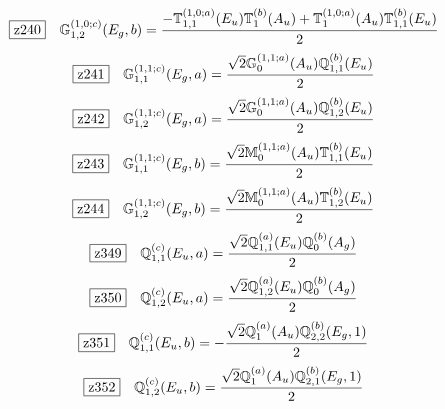 \documentclass[fleqn,10pt,landscape]{jsarticle}
\begin{document}
\begin{dmath*}
\hspace*{3mm}\fbox{z240}\quad \mathbb{G}_{1,2}^{(1,0;c)}(E_{g},b)=\frac{- \mathbb{T}_{1,1}^{(1,0;a)}(E_{u}) \mathbb{T}_{1}^{(b)}(A_{u}) + \mathbb{T}_{1}^{(1,0;a)}(A_{u}) \mathbb{T}_{1,1}^{(b)}(E_{u})}{2}
\end{dmath*}
\begin{dmath*}
\hspace*{3mm}\fbox{z241}\quad \mathbb{G}_{1,1}^{(1,1;c)}(E_{g},a)=\frac{\sqrt{2} \mathbb{G}_{0}^{(1,1;a)}(A_{u}) \mathbb{Q}_{1,1}^{(b)}(E_{u})}{2}
\end{dmath*}
\begin{dmath*}
\hspace*{3mm}\fbox{z242}\quad \mathbb{G}_{1,2}^{(1,1;c)}(E_{g},a)=\frac{\sqrt{2} \mathbb{G}_{0}^{(1,1;a)}(A_{u}) \mathbb{Q}_{1,2}^{(b)}(E_{u})}{2}
\end{dmath*}
\begin{dmath*}
\hspace*{3mm}\fbox{z243}\quad \mathbb{G}_{1,1}^{(1,1;c)}(E_{g},b)=\frac{\sqrt{2} \mathbb{M}_{0}^{(1,1;a)}(A_{u}) \mathbb{T}_{1,1}^{(b)}(E_{u})}{2}
\end{dmath*}
\begin{dmath*}
\hspace*{3mm}\fbox{z244}\quad \mathbb{G}_{1,2}^{(1,1;c)}(E_{g},b)=\frac{\sqrt{2} \mathbb{M}_{0}^{(1,1;a)}(A_{u}) \mathbb{T}_{1,2}^{(b)}(E_{u})}{2}
\end{dmath*}
\begin{dmath*}
\hspace*{3mm}\fbox{z349}\quad \mathbb{Q}_{1,1}^{(c)}(E_{u},a)=\frac{\sqrt{2} \mathbb{Q}_{1,1}^{(a)}(E_{u}) \mathbb{Q}_{0}^{(b)}(A_{g})}{2}
\end{dmath*}
\begin{dmath*}
\hspace*{3mm}\fbox{z350}\quad \mathbb{Q}_{1,2}^{(c)}(E_{u},a)=\frac{\sqrt{2} \mathbb{Q}_{1,2}^{(a)}(E_{u}) \mathbb{Q}_{0}^{(b)}(A_{g})}{2}
\end{dmath*}
\begin{dmath*}
\hspace*{3mm}\fbox{z351}\quad \mathbb{Q}_{1,1}^{(c)}(E_{u},b)=- \frac{\sqrt{2} \mathbb{Q}_{1}^{(a)}(A_{u}) \mathbb{Q}_{2,2}^{(b)}(E_{g},1)}{2}
\end{dmath*}
\begin{dmath*}
\hspace*{3mm}\fbox{z352}\quad \mathbb{Q}_{1,2}^{(c)}(E_{u},b)=\frac{\sqrt{2} \mathbb{Q}_{1}^{(a)}(A_{u}) \mathbb{Q}_{2,1}^{(b)}(E_{g},1)}{2}
\end{dmath*}
\end{document}
